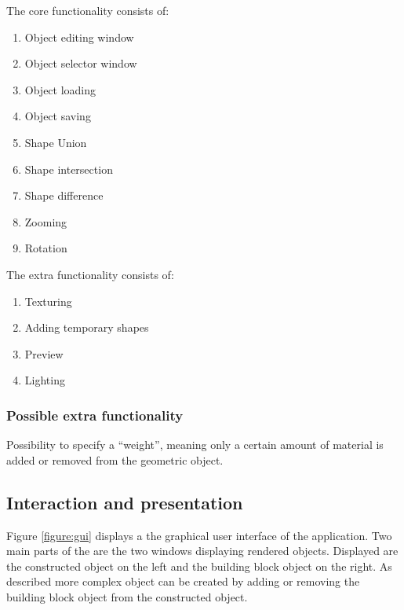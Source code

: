 \documentclass[a4wide,10pt,twocolumn]{article}
\begin{document}
The core functionality consists of: \\
\vspace{-10pt}
\begin{enumerate}
    \setlength{\itemsep}{-0.3em}
	\item Object editing window
	\item Object selector window
	\item Object loading
	\item Object saving
	\item Shape Union
	\item Shape intersection
	\item Shape difference
	\item Zooming
	\item Rotation
\end{enumerate}
\bigskip
The extra functionality consists of: \\
\vspace{-10pt}
\begin{enumerate}
    \setlength{\itemsep}{-0.3em}
	\item Texturing
	\item Adding temporary shapes
	\item Preview
	\item Lighting
\end{enumerate}

\subsubsection{Possible extra functionality}
Possibility to specify a ``weight'', meaning only a certain amount of material is added or removed from the geometric object.

\subsection{Interaction and presentation}



Figure \ref{figure:gui} displays a the graphical user interface of the application. Two main parts of the are the two windows displaying rendered objects. Displayed are the constructed object on the left and the building block object on the right. As described more complex object can be created by adding or removing the building block object from the constructed object.
\end{document}
